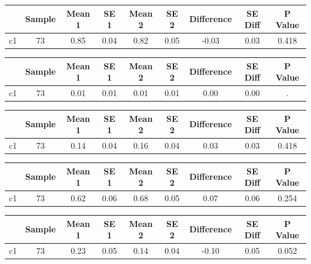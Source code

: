 {
\def\sym#1{\ifmmode^{#1}\else\(^{#1}\)\fi}
\begin{tabular}{l*{1}{cccccccc}}
\hline\hline
            &      Sample&      Mean 1&        SE 1&      Mean 2&        SE 2&  Difference&     SE Diff&     P Value\\
\hline
c1          &          73&        0.85&        0.04&        0.82&        0.05&       -0.03&        0.03&       0.418\\
\hline\hline
\end{tabular}
}
{
\def\sym#1{\ifmmode^{#1}\else\(^{#1}\)\fi}
\begin{tabular}{l*{1}{cccccccc}}
\hline\hline
            &      Sample&      Mean 1&        SE 1&      Mean 2&        SE 2&  Difference&     SE Diff&     P Value\\
\hline
c1          &          73&        0.01&        0.01&        0.01&        0.01&        0.00&        0.00&           .\\
\hline\hline
\end{tabular}
}
{
\def\sym#1{\ifmmode^{#1}\else\(^{#1}\)\fi}
\begin{tabular}{l*{1}{cccccccc}}
\hline\hline
            &      Sample&      Mean 1&        SE 1&      Mean 2&        SE 2&  Difference&     SE Diff&     P Value\\
\hline
c1          &          73&        0.14&        0.04&        0.16&        0.04&        0.03&        0.03&       0.418\\
\hline\hline
\end{tabular}
}
{
\def\sym#1{\ifmmode^{#1}\else\(^{#1}\)\fi}
\begin{tabular}{l*{1}{cccccccc}}
\hline\hline
            &      Sample&      Mean 1&        SE 1&      Mean 2&        SE 2&  Difference&     SE Diff&     P Value\\
\hline
c1          &          73&        0.62&        0.06&        0.68&        0.05&        0.07&        0.06&       0.254\\
\hline\hline
\end{tabular}
}
{
\def\sym#1{\ifmmode^{#1}\else\(^{#1}\)\fi}
\begin{tabular}{l*{1}{cccccccc}}
\hline\hline
            &      Sample&      Mean 1&        SE 1&      Mean 2&        SE 2&  Difference&     SE Diff&     P Value\\
\hline
c1          &          73&        0.23&        0.05&        0.14&        0.04&       -0.10&        0.05&       0.052\\
\hline\hline
\end{tabular}
}
